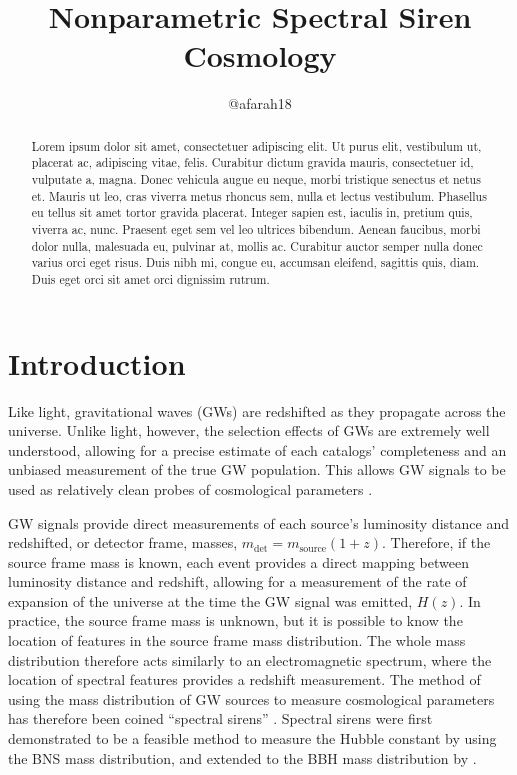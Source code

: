 \documentclass[]{aastex631}
\newcommand{\source}{\text{source}}
\begin{document}
\title{Nonparametric Spectral Siren Cosmology}

\author{@afarah18}

\begin{abstract}
    Lorem ipsum dolor sit amet, consectetuer adipiscing elit.
    Ut purus elit, vestibulum ut, placerat ac, adipiscing vitae, felis.
    Curabitur dictum gravida mauris, consectetuer id, vulputate a, magna.
    Donec vehicula augue eu neque, morbi tristique senectus et netus et.
    Mauris ut leo, cras viverra metus rhoncus sem, nulla et lectus vestibulum.
    Phasellus eu tellus sit amet tortor gravida placerat.
    Integer sapien est, iaculis in, pretium quis, viverra ac, nunc.
    Praesent eget sem vel leo ultrices bibendum.
    Aenean faucibus, morbi dolor nulla, malesuada eu, pulvinar at, mollis ac.
    Curabitur auctor semper nulla donec varius orci eget risus.
    Duis nibh mi, congue eu, accumsan eleifend, sagittis quis, diam.
    Duis eget orci sit amet orci dignissim rutrum.
\end{abstract}

\section{Introduction}
\label{sec:intro}
Like light, gravitational waves (GWs) are redshifted as they propagate across the universe.
Unlike light, however, the selection effects of GWs are extremely well understood, allowing for a precise estimate of each catalogs' completeness and an unbiased measurement of the true GW population.
This allows GW signals to be used as relatively clean probes of cosmological parameters \citep[e.g.][]{bright sirens first paper, 170817 bright siren, dark siren first paper, dark siren with 0817, hithhikers guide}.

GW signals provide direct measurements of each source's luminosity distance and redshifted, or detector frame, masses, $m_{\det} = m_{\source}(1+z)$.
Therefore, if the source frame mass is known, each event provides a direct mapping between luminosity distance and redshift, allowing for a measurement of the rate of expansion of the universe at the time the GW signal was emitted, $H(z)$.
In practice, the source frame mass is unknown, but it is possible to know the location of features in the source frame mass distribution.
The whole mass distribution therefore acts similarly to an electromagnetic spectrum, where the location of spectral features provides a redshift measurement.
The method of using the mass distribution of GW sources to measure cosmological parameters has therefore been coined ``spectral sirens'' \citep{ezquiaga_spectral_2022}.
Spectral sirens were first demonstrated to be a feasible method to measure the Hubble constant by \cite{chernoff+fin} using the BNS mass distribution, and extended to the BBH mass distribution by \cite{farr_future_2019}.
\end{document}
